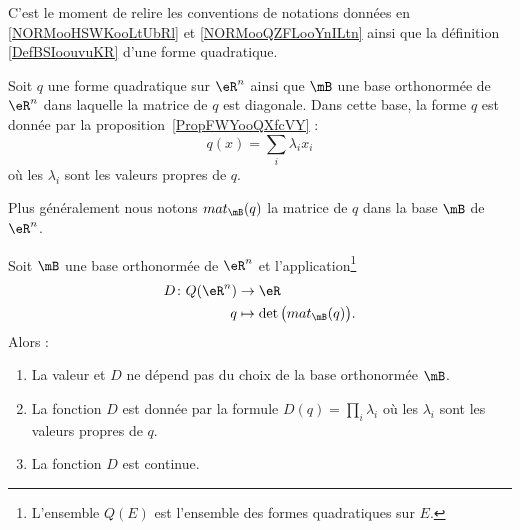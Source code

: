C'est le moment de relire les conventions de notations données en \ref{NORMooHSWKooLtUbRl} et \ref{NORMooQZFLooYnILtn} ainsi que la définition \ref{DefBSIoouvuKR} d'une forme quadratique.

Soit \( q\) une forme quadratique sur \( \eR^n\) ainsi que \( \mB\) une base orthonormée de \( \eR^n\) dans laquelle la matrice de  \( q\) est diagonale. Dans cette base, la forme \( q\) est donnée par la proposition~\ref{PropFWYooQXfcVY} :
\begin{equation}
	q(x)=\sum_i\lambda_ix_i
\end{equation}
où les \( \lambda_i\) sont les valeurs propres de \( q\).

Plus généralement nous notons \( mat_{\mB}(q)\) la matrice de \( q\) dans la base \( \mB\) de \( \eR^n\).

\begin{proposition} \label{PropOXWooYrDKpw}
	Soit \( \mB\) une base orthonormée de \( \eR^n\) et l'application\footnote{L'ensemble \( Q(E)\) est l'ensemble des formes quadratiques sur \( E\).}
	\begin{equation}
		\begin{aligned}
			D\colon Q(\eR^n) & \to \eR                                \\
			q                & \mapsto \det\big( mat_{\mB}(q) \big) .
		\end{aligned}
	\end{equation}
	Alors :
	\begin{enumerate}
		\item
		      La valeur et \( D\) ne dépend pas du choix de la base orthonormée \( \mB\).
		\item
		      La fonction \( D\) est donnée par la formule \( D(q)=\prod_i\lambda_i\) où les \( \lambda_i\) sont les valeurs propres de \( q\).
		\item
		      La fonction \( D\) est continue.
	\end{enumerate}
\end{proposition}

